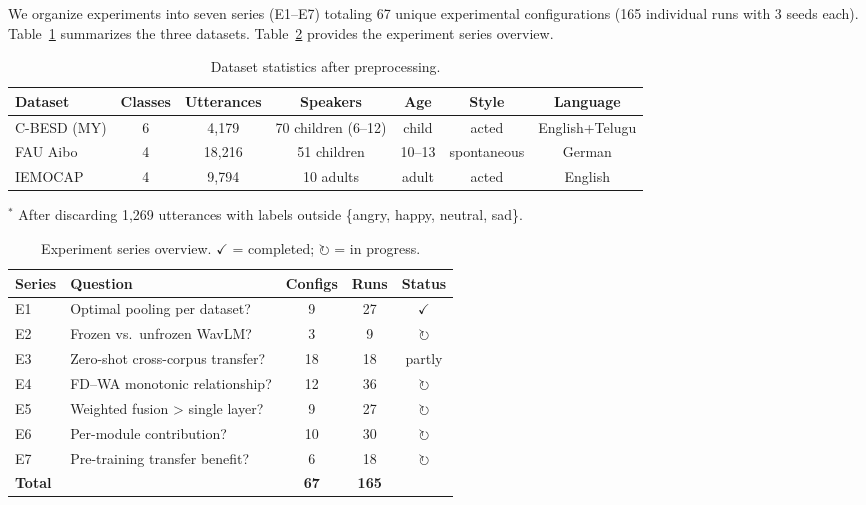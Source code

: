 \documentclass[11pt,a4paper]{article}
\begin{document}
We organize experiments into seven series (E1--E7) totaling 67 unique
experimental configurations (165 individual runs with 3 seeds each).
Table~\ref{tab:datasets} summarizes the three datasets.
Table~\ref{tab:exp_overview} provides the experiment series overview.

\begin{table}[t]
\centering
\caption{Dataset statistics after preprocessing.}
\label{tab:datasets}
\begin{tabular}{lcccccc}
\toprule
\textbf{Dataset} & \textbf{Classes} & \textbf{Utterances} & \textbf{Speakers} & \textbf{Age} & \textbf{Style} & \textbf{Language} \\
\midrule
C-BESD (MY) & 6 & 4,179 & 70 children (6--12) & child & acted & English+Telugu \\
FAU Aibo    & 4 & 18,216 & 51 children & 10--13 & spontaneous & German \\
IEMOCAP     & 4 & 9,794 & 10 adults & adult & acted & English \\
\bottomrule
\end{tabular}
\vspace{4pt}
\footnotesize{$^*$ After discarding 1,269 utterances with labels outside \{angry, happy, neutral, sad\}.}
\end{table}

\begin{table}[t]
\centering
\caption{Experiment series overview. $\checkmark$ = completed; $\circlearrowright$ = in progress.}
\label{tab:exp_overview}
\begin{tabular}{llccc}
\toprule
\textbf{Series} & \textbf{Question} & \textbf{Configs} & \textbf{Runs} & \textbf{Status} \\
\midrule
E1 & Optimal pooling per dataset? & 9 & 27 & $\checkmark$ \\
E2 & Frozen vs.\ unfrozen WavLM? & 3 & 9 & $\circlearrowright$ \\
E3 & Zero-shot cross-corpus transfer? & 18 & 18 & partly \\
E4 & FD--WA monotonic relationship? & 12 & 36 & $\circlearrowright$ \\
E5 & Weighted fusion > single layer? & 9 & 27 & $\circlearrowright$ \\
E6 & Per-module contribution? & 10 & 30 & $\circlearrowright$ \\
E7 & Pre-training transfer benefit? & 6 & 18 & $\circlearrowright$ \\
\midrule
\textbf{Total} & & \textbf{67} & \textbf{165} & \\
\bottomrule
\end{tabular}
\end{table}
\end{document}
